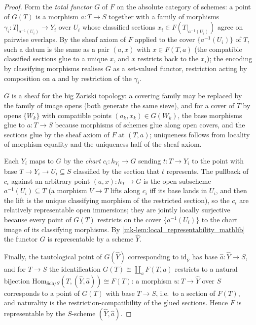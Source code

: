 \begin{proof}
  \leanok{}
  Form the \emph{total functor} \(G\) of \(F\) on the absolute category of
  schemes: a point of \(G(T)\) is a morphism \(a : T \to S\) together with
  a family of morphisms \(\gamma_i : T|_{a^{-1}(U_i)} \to Y_i\) over
  \(U_i\) whose classified sections
  \(x_i \in F(T|_{a^{-1}(U_i)})\) agree on pairwise overlaps.  By the
  sheaf axiom of \(F\) applied to the cover \(\{a^{-1}(U_i)\}\) of \(T\),
  such a datum is the same as a pair \((a, x)\) with \(x \in F(T, a)\)
  (the compatible classified sections glue to a unique \(x\), and \(x\)
  restricts back to the \(x_i\)); the encoding by classifying morphisms
  realises \(G\) as a set-valued functor, restriction acting by composition
  on \(a\) and by restriction of the \(\gamma_i\).

  \(G\) is a sheaf for the big Zariski topology: a covering family may be
  replaced by the family of image opens (both generate the same sieve), and
  for a cover of \(T\) by opens \(\{W_k\}\) with compatible points
  \((a_k, x_k) \in G(W_k)\), the base morphisms glue to \(a : T \to S\)
  because morphisms of schemes glue along open covers, and the sections
  glue by the sheaf axiom of \(F\) at \((T, a)\); uniqueness follows from
  locality of morphism equality and the uniqueness half of the sheaf axiom.

  Each \(Y_i\) maps to \(G\) by the \emph{chart}
  \(c_i : h_{Y_i} \to G\) sending \(t : T \to Y_i\) to the point with
  base \(T \to Y_i \to U_i \subseteq S\) classified by the section that
  \(t\) represents.  The pullback of \(c_i\) against an arbitrary point
  \((a, x) : h_T \to G\) is the open subscheme \(a^{-1}(U_i) \subseteq T\)
  (a morphism \(V \to T\) lifts along \(c_i\) iff its base lands in
  \(U_i\), and then the lift is the unique classifying morphism of the
  restricted section), so the \(c_i\) are relatively representable open
  immersions; they are jointly locally surjective because every point of
  \(G(T)\) restricts on the cover \(\{a^{-1}(U_i)\}\) to the chart image
  of its classifying morphisms.  By
  \ref{mk-lem:local_representability_mathlib} the functor \(G\) is
  representable by a scheme \(\hat{Y}\).

  Finally, the tautological point of \(G(\hat{Y})\) corresponding to
  \(\mathrm{id}_{\hat{Y}}\) has base \(\hat{a} : \hat{Y} \to S\), and for
  \(T \to S\) the identification \(G(T) \cong \coprod_{a} F(T, a)\)
  restricts to a natural bijection
  \(\mathrm{Hom}_{\mathrm{Sch}/S}(T, (\hat{Y}, \hat{a})) \cong F(T)\):
  a morphism \(u : T \to \hat{Y}\) over \(S\) corresponds to a point of
  \(G(T)\) with base \(T \to S\), i.e.\ to a section of \(F(T)\), and
  naturality is the restriction-compatibility of the glued sections.  Hence
  \(F\) is representable by the \(S\)-scheme \((\hat{Y}, \hat{a})\).
\end{proof}

